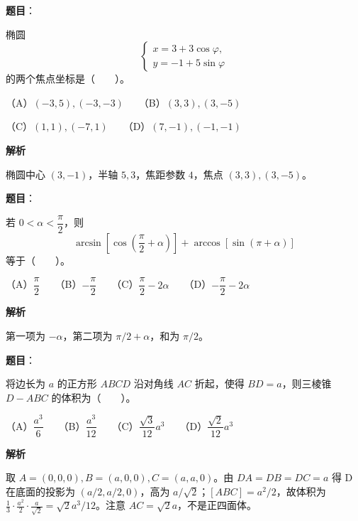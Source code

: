 \begin{answer}

\textbf{题目}：

椭圆
\nopagebreak[4]
\[
\begin{cases}
x=3+3\cos\varphi,\\
y=-1+5\sin\varphi
\end{cases}
\]
的两个焦点坐标是\mbox{（　　）}。

（A）$(-3,5),(-3,-3)$　　（B）$(3,3),(3,-5)$

（C）$(1,1),(-7,1)$　　（D）$(7,-1),(-1,-1)$

\textbf{解析}

椭圆中心 $(3,-1)$，半轴 $5,3$，焦距参数 $4$，焦点 $(3,3),(3,-5)$。


\end{answer}
\begin{answer}

\textbf{题目}：

若 $0<\alpha<\dfrac{\pi}{2}$，则
\nopagebreak[4]
\[
\arcsin\left[\cos\left(\frac{\pi}{2}+\alpha\right)\right]
+\arccos\left[\sin(\pi+\alpha)\right]
\]
等于\mbox{（　　）}。

（A）$\dfrac{\pi}{2}$　　（B）$-\dfrac{\pi}{2}$　　（C）$\dfrac{\pi}{2}-2\alpha$　　（D）$-\dfrac{\pi}{2}-2\alpha$

\textbf{解析}

第一项为 $-\alpha$，第二项为 $\pi/2+\alpha$，和为 $\pi/2$。


\end{answer}
\begin{answer}

\textbf{题目}：

将边长为 $a$ 的正方形 $ABCD$ 沿对角线 $AC$ 折起，使得 $BD=a$，则三棱锥 $D-ABC$ 的体积为\mbox{（　　）}。

（A）$\dfrac{a^3}{6}$　　（B）$\dfrac{a^3}{12}$　　（C）$\dfrac{\sqrt{3}}{12}a^3$　　（D）$\dfrac{\sqrt{2}}{12}a^3$

\textbf{解析}

取 $A=(0,0,0),B=(a,0,0),C=(a,a,0)$。由 $DA=DB=DC=a$ 得 D 在底面的投影为 $(a/2,a/2,0)$，高为 $a/\sqrt2$；$[ABC]=a^2/2$，故体积为 $\frac13\cdot\frac{a^2}{2}\cdot\frac{a}{\sqrt2}=\sqrt2a^3/12$。注意 $AC=\sqrt2a$，不是正四面体。


\end{answer}
